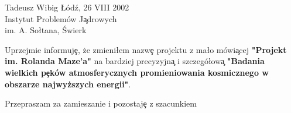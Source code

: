 \textwidth  15cm
\def\ods{\vspace{5mm}}

\pagestyle{empty}
\large
\noindent Tadeusz Wibig
\hfill
\L \'{o}d\'{z}, 26 VIII 2002\\
\noindent
Instytut Problem\'{o}w J\c{a}drowych \\
im. A. So\l tana, \'{S}wierk\\
\vspace{1.5cm}

\vspace{1.5cm}


Uprzejmie informuj\c{e}, \.{z}e zmieni\l em nazw\c{e} projektu z ma\l o m\'{o}wi\c{a}cej
{\bf "Projekt im. Rolanda Maze'a"} na bardziej precyzyjn\c{a} i szczeg\'{o}\l ow\c{a}
{\bf "Badania wielkich p\c{e}k\'{o}w atmosferycznych promieniowania kosmicznego
w obszarze najwy\.{z}szych energii"}.
\ods

\noindent
Przepraszam za zamieszanie i pozostaj\c{e} z szacunkiem











